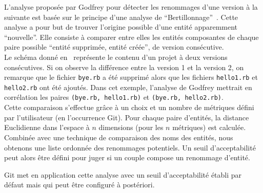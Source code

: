 L'analyse proposée par Godfrey pour détecter les renommages d'une version à la suivante est basée sur le principe d'une analyse de ``Bertillonnage''~\cite{bertillonnage}. Cette analyse a pour but de trouver l’origine possible d’une entité apparemment ``nouvelle''. Elle consiste à comparer entre elles les entités composantes de chaque paire possible ``entité supprimée, entité créée'', de version consécutive.\\ 

Le schéma donné en~ représente le contenu d'un projet à deux versions consécutives. Si on observe la différence entre la version 1 et la version 2, on remarque que le fichier \texttt{bye.rb} a été supprimé alors que les fichiers \texttt{hello1.rb} et \texttt{hello2.rb} ont été ajoutés.
Dans cet exemple, l'analyse de Godfrey mettrait en corrélation les paires \texttt{(bye.rb, hello1.rb)} et \texttt{(bye.rb, hello2.rb)}.\\  

Cette comparaison s'effectue grâce à un choix et un nombre de métriques défini par l'utilisateur (en l'occurrence Git). Pour chaque paire d'entités, la distance Euclidienne dans l’espace à $n$ dimensions (pour les $n$ métriques) est calculée. Combinée avec une technique de comparaison des noms des entités, nous obtenons une liste ordonnée des renommages potentiels. Un seuil d'acceptabilité peut alors être défini pour juger si un couple compose un renommage d'entité.

Git met en application cette analyse avec un seuil d'acceptabilité établi par défaut mais qui peut être configuré à postériori.\\



